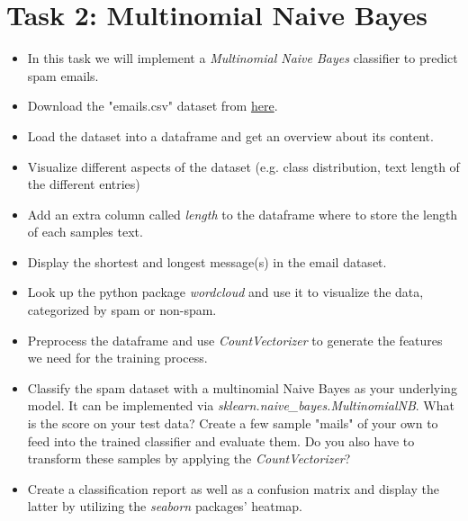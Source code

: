 \documentclass{article}
\begin{document}
\section*{Task 2: Multinomial Naive Bayes}
\begin{itemize}
    \item In this task we will implement a \emph{Multinomial Naive Bayes} classifier to predict spam emails.
    \item Download the "emails.csv" dataset from \href{https://github.com/DataScienceLabFHSWF/MachineLearningCourse/tree/main/data/04}{here}.
    \item Load the dataset into a dataframe and get an overview about its content.
    \item Visualize different aspects of the dataset (e.g. class distribution, text length of the different entries)
    \item Add an extra column called \emph{length} to the dataframe where to store the length of each samples text.
    \item Display the shortest and longest message(s) in the email dataset.
    \item Look up the python package \emph{wordcloud} and use it to visualize the data, categorized by spam or non-spam.
    \item Preprocess the dataframe and use \emph{CountVectorizer} to generate the features we need for the training process.
    \item Classify the spam dataset with a multinomial Naive Bayes as your underlying model. It can be implemented via \emph{sklearn.naive\_bayes.MultinomialNB}. What is the score on your test data? Create a few sample "mails" of your own to feed into the trained classifier and evaluate them. Do you also have to transform these samples by applying the \emph{CountVectorizer}? 
    \item Create a classification report as well as a confusion matrix and display the latter by utilizing the \emph{seaborn} packages' heatmap.
\end{itemize}
\end{document}
